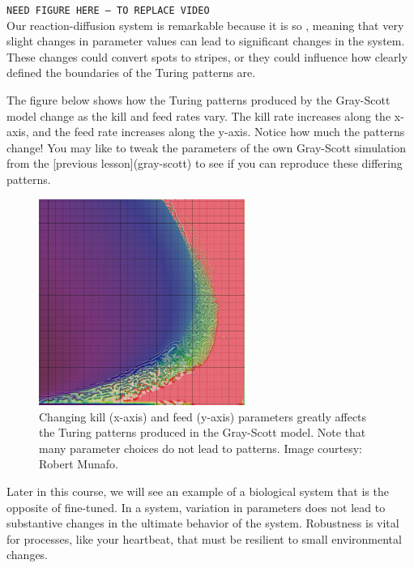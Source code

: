 {{\texttt{NEED FIGURE HERE -- TO REPLACE VIDEO}\\

Our reaction-diffusion system is remarkable because it is so , meaning that very slight changes in parameter values can lead to significant changes in the system. These changes could convert spots to stripes, or they could influence how clearly defined the boundaries of the Turing patterns are.

The figure below shows how the Turing patterns produced by the Gray-Scott model change as the kill and feed rates vary. The kill rate increases along the x-axis, and the feed rate increases along the y-axis. Notice how much the patterns change! You may like to tweak the parameters of the own Gray-Scott simulation from the [previous lesson](gray-scott) to see if you can reproduce these differing patterns.

\begin{figure}[h]
\centering
\mySfFamily
\includegraphics[width = 0.6\textwidth]{../images/xmorphia-parameter-map.jpg}
\caption{Changing kill (x-axis) and feed (y-axis) parameters greatly affects the Turing patterns produced in the Gray-Scott model. Note that many parameter choices do not lead to patterns. Image courtesy: Robert Munafo.}
\label{fig:xmorphia-parameter-map}
\end{figure}

Later in this course, we will see an example of a biological system that is the opposite of fine-tuned. In a  system, variation in parameters does not lead to substantive changes in the ultimate behavior of the system. Robustness is vital for processes, like your heartbeat, that must be resilient to small environmental changes.

}}
